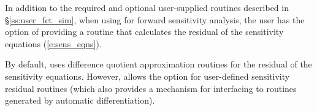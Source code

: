 In addition to the required and optional user-supplied routines described
in \S\ref{ss:user_fct_sim}, when using {\idas} for forward sensitivity analysis,
the user has the option of providing a routine that calculates the residual 
of the sensitivity equations (\ref{e:sens_eqns}).

By default, {\idas} uses difference quotient approximation routines for the 
residual of the sensitivity equations. However, {\idas} allows the option for 
user-defined sensitivity residual routines (which also provides a mechanism for 
interfacing {\idas} to routines generated by automatic differentiation).


